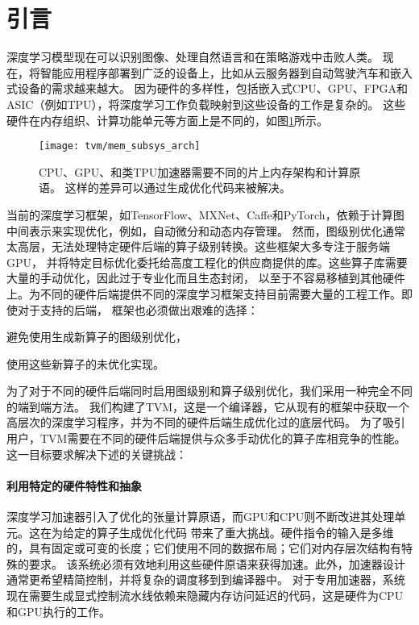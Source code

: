 \section{引言}
深度学习模型现在可以识别图像、处理自然语言和在策略游戏中击败人类。
现在，将智能应用程序部署到广泛的设备上，比如从云服务器到自动驾驶汽车和嵌入式设备的需求越来越大。
因为硬件的多样性，包括嵌入式CPU、GPU、FPGA和ASIC（例如TPU），将深度学习工作负载映射到这些设备的工作是复杂的。
这些硬件在内存组织、计算功能单元等方面上是不同的，如图\ref{fig:mem subsys arch}所示。

\begin{figure}[htbp]
    \centering
    \texttt{[image: tvm/mem\_subsys\_arch]}
    \caption{\label{fig:mem subsys arch}CPU、GPU、和类TPU加速器需要不同的片上内存架构和计算原语。
    这样的差异可以通过生成优化代码来被解决。}
\end{figure}

当前的深度学习框架，如TensorFlow、MXNet、Caffe和PyTorch，依赖于计算图中间表示来实现优化，例如，自动微分和动态内存管理。
然而，图级别优化通常太高层，无法处理特定硬件后端的算子级别转换。这些框架大多专注于服务端GPU，
并将特定目标优化委托给高度工程化的供应商提供的库。这些算子库需要大量的手动优化，因此过于专业化而且生态封闭，
以至于不容易移植到其他硬件上。为不同的硬件后端提供不同的深度学习框架支持目前需要大量的工程工作。即使对于支持的后端，
框架也必须做出艰难的选择：
\begin{enumerate*}
    \item 避免使用生成新算子的图级别优化，
    \item 使用这些新算子的未优化实现。
\end{enumerate*}

为了对于不同的硬件后端同时启用图级别和算子级别优化，我们采用一种完全不同的端到端方法。
我们构建了TVM，这是一个编译器，它从现有的框架中获取一个高层次的深度学习程序，并为不同的硬件后端生成优化过的底层代码。
为了吸引用户，TVM需要在不同的硬件后端提供与众多手动优化的算子库相竞争的性能。这一目标要求解决下述的关键挑战：

\paragraph{利用特定的硬件特性和抽象}
深度学习加速器引入了优化的张量计算原语，而GPU和CPU则不断改进其处理单元。这在为给定的算子生成优化代码
带来了重大挑战。硬件指令的输入是多维的，具有固定或可变的长度；它们使用不同的数据布局；它们对内存层次结构有特殊的要求。
该系统必须有效地利用这些硬件原语来获得加速。此外，加速器设计通常更希望精简控制，并将复杂的调度移到到编译器中。
对于专用加速器，系统现在需要生成显式控制流水线依赖来隐藏内存访问延迟的代码，这是硬件为CPU和GPU执行的工作。

